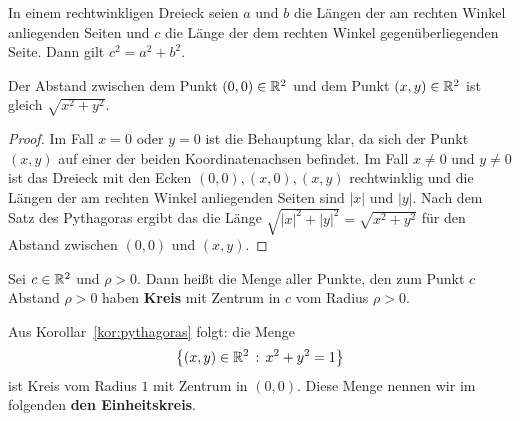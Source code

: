 \begin{thm}
	In einem rechtwinkligen Dreieck seien $a$ und $b$ die Längen der am rechten Winkel anliegenden Seiten und $c$ die Länge der dem rechten Winkel gegenüberliegenden Seite. Dann gilt $c^2 = a^2 + b^2$. 
\end{thm} 

\begin{kor} \label{kor:pythagoras}
	Der Abstand zwischen dem Punkt $(0,0) \in \mathbb{R}^2$ und dem Punkt $(x,y) \in \mathbb{R}^2$ ist gleich $\sqrt{x^2 + y^2}$. 
\end{kor} 
\begin{proof} 
 	Im Fall $x =0$ oder $y=0$ ist die Behauptung klar, da sich der Punkt $(x,y)$ auf einer der beiden Koordinatenachsen befindet. Im Fall $x \ne 0$ und $y \ne 0$ ist das Dreieck mit den Ecken $(0,0), (x,0), (x,y)$ rechtwinklig und die Längen der am rechten Winkel anliegenden Seiten sind $|x|$ und $|y|$. Nach dem Satz des Pythagoras ergibt das die Länge $\sqrt{|x|^2 + |y|^2} = \sqrt{x^2 + y^2}$ für den Abstand zwischen $(0,0)$ und $(x,y)$. 
\end{proof} 

\begin{defn}
	Sei $c \in \mathbb{R}^2$ und $\rho>0$. Dann heißt die Menge aller Punkte, den zum Punkt $c$ Abstand $\rho>0$ haben \textbf{Kreis} mit Zentrum in $c$ vom Radius $\rho>0$. 
\end{defn} 

\begin{bem}
	Aus Korollar~\ref{kor:pythagoras} folgt: die Menge 
	\[
		\left\{ (x,y) \in \mathbb{R}^2 \,:\, x^2 + y^2 = 1 \right\}
	\] ist Kreis vom Radius $1$ mit Zentrum in $(0,0)$. Diese Menge nennen wir im folgenden \textbf{den Einheitskreis}. 
\end{bem} 

